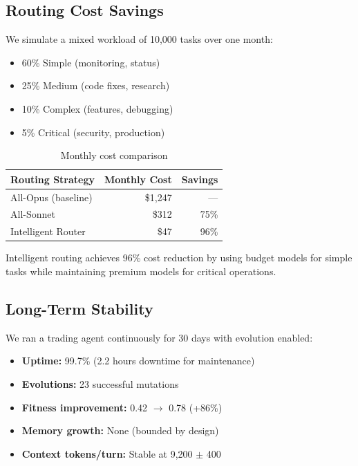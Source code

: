 \documentclass{article}
\begin{document}
\subsection{Routing Cost Savings}

We simulate a mixed workload of 10,000 tasks over one month:

\begin{itemize}[leftmargin=*]
    \item 60\% Simple (monitoring, status)
    \item 25\% Medium (code fixes, research)
    \item 10\% Complex (features, debugging)
    \item 5\% Critical (security, production)
\end{itemize}

\begin{table}[h]
\centering
\caption{Monthly cost comparison}
\label{tab:cost_savings}
\begin{tabular}{lrr}
\toprule
\textbf{Routing Strategy} & \textbf{Monthly Cost} & \textbf{Savings} \\
\midrule
All-Opus (baseline) & \$1,247 & --- \\
All-Sonnet & \$312 & 75\% \\
Intelligent Router & \$47 & 96\% \\
\bottomrule
\end{tabular}
\end{table}

Intelligent routing achieves 96\% cost reduction by using budget models for simple tasks while maintaining premium models for critical operations.

\subsection{Long-Term Stability}

We ran a trading agent continuously for 30 days with evolution enabled:

\begin{itemize}[leftmargin=*]
    \item \textbf{Uptime:} 99.7\% (2.2 hours downtime for maintenance)
    \item \textbf{Evolutions:} 23 successful mutations
    \item \textbf{Fitness improvement:} 0.42 $\to$ 0.78 (+86\%)
    \item \textbf{Memory growth:} None (bounded by design)
    \item \textbf{Context tokens/turn:} Stable at 9,200 $\pm$ 400
\end{itemize}
\end{document}
